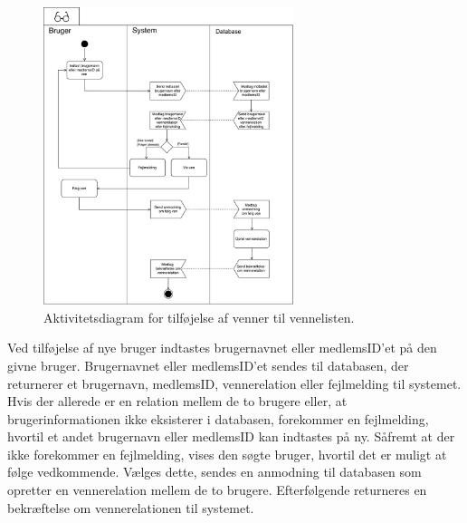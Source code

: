\begin{figure} [H]
\centering
\includegraphics[width=0.65\textwidth]{figures/aktivitetsdiagram/foelgnyven}
\caption{Aktivitetsdiagram for tilføjelse af venner til vennelisten.}
\label{fig:tilfoejven}
\end{figure}

Ved tilføjelse af nye bruger indtastes brugernavnet eller medlemsID'et på den givne bruger. Brugernavnet eller medlemsID'et sendes til databasen, der returnerer et brugernavn, medlemsID, vennerelation eller fejlmelding til systemet. Hvis der allerede er en relation mellem de to brugere eller, at brugerinformationen ikke eksisterer i databasen, forekommer en fejlmelding, hvortil et andet brugernavn eller medlemsID kan indtastes på ny. 
Såfremt at der ikke forekommer en fejlmelding, vises den søgte bruger, hvortil det er muligt at følge vedkommende. 
Vælges dette, sendes en anmodning til databasen som opretter en vennerelation mellem de to brugere. Efterfølgende returneres en bekræftelse om vennerelationen til systemet.